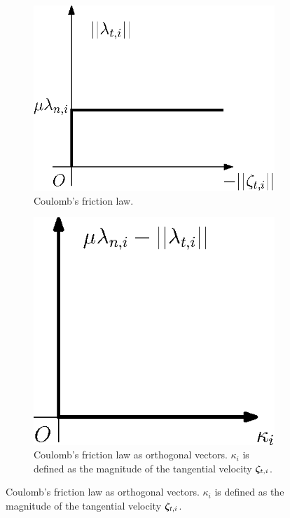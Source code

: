 \documentclass[../DC2017114Bouma.tex]{subfiles}
\begin{document}
\begin{figure}[h]
\centering
\begin{subfigure}{0.3\textwidth}
\centering
\includegraphics[width=\linewidth]{coulombfriction.eps}\caption{Coulomb's friction law.}\label{fig:coulombfriction}
\end{subfigure}
\qquad
\begin{subfigure}{0.3\textwidth}
\centering
\includegraphics[width=\linewidth]{coulombort.eps}\caption{Coulomb's friction law as orthogonal vectors. $\kappa_i$ is defined as the magnitude of the tangential velocity $\boldsymbol{\zeta}_{t,i}$.}\label{fig:coulombort}
\end{subfigure}
\end{figure}
\end{document}
